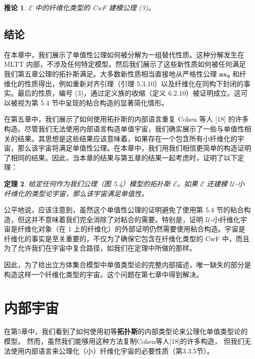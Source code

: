 \documentclass{ctexrep}
\theoremstyle{plain}
\newtheorem{theorem}{定理}[section]
\newtheorem{corollary}[theorem]{推论}
\theoremstyle{definition}
\theoremstyle{remark}
\newcommand{\ax}[1]{\mathbf{ax_{#1}}}
\begin{document}
\begin{corollary}
$\mathcal{E}$ 中的纤维化类型的 CwF 建模公理 (3)。
\end{corollary}

\section{结论}

在本章中，我们展示了单值性公理如何被分解为一组替代性质。这种分解发生在 MLTT 内部，不涉及任何特定模型。然后我们展示了这些新性质如何被任何满足我们第五章公理的拓扑斯满足。大多数新性质相当直接地从严格性公理 $\ax{9}$ 和纤维化的性质得出，例如重新对齐引理（引理 5.3.10）以及纤维化在同构下封闭的事实。最后的性质，编号 (3)，通过定义族的收缩（定义 6.2.10）被证明成立。这可以被视为第 5.4 节中呈现的粘合构造的显著简化情形。

在第五章中，我们展示了如何使用拓扑斯的内部语言重复 Cohen 等人 [18] 的许多构造。尽管我们无法使用内部语言构造单值宇宙，我们确实展示了一些与单值性相关的结果。其思想是这些结果应该意味着，如果存在一个包含所有小纤维化的宇宙，那么该宇宙将满足单值性公理。在本章中，我们用我们相信更简单的构造证明了相同的结果。因此，当本章的结果与第五章的结果一起考虑时，证明了以下定理：

\begin{theorem}
给定任何作为我们公理（图 5.4）模型的拓扑斯 $\mathcal{E}$。如果 $\mathcal{E}$ 还建模 $\mathcal{U}$-小纤维化的类型论宇宙，那么该宇宙满足单值性。
\end{theorem}

公平地说，应该注意到，虽然这个单值性公理的证明避免了使用第 5.4 节的粘合构造，但这并不意味着我们完全消除了对粘合的需要。特别是，证明 $\mathcal{U}$-小纤维化宇宙是纤维化对象（在 1 上的纤维化）的外部证明仍然需要使用粘合构造。宇宙是纤维化的事实是至关重要的，不仅为了确保它包含在纤维化类型的 CwF 中，而且为了允许我们在宇宙中复合路径，如我们在定理中所做的那样。

因此，为了给出立方体集合模型中单值类型论的完整内部描述，唯一缺失的部分是构造这样一个纤维化类型的宇宙。这个问题在第七章中得到解决。

\chapter{内部宇宙}

在第5章中，我们看到了如何使用初等\textbf{拓扑斯}的内部类型论来公理化单值类型论的模型。
然而，虽然我们能够用这种方法复制Cohen等人[18]的许多构造，
但我们无法使用内部语言来公理化（小）纤维化宇宙的必要性质（第3.3.5节）。
\end{document}
